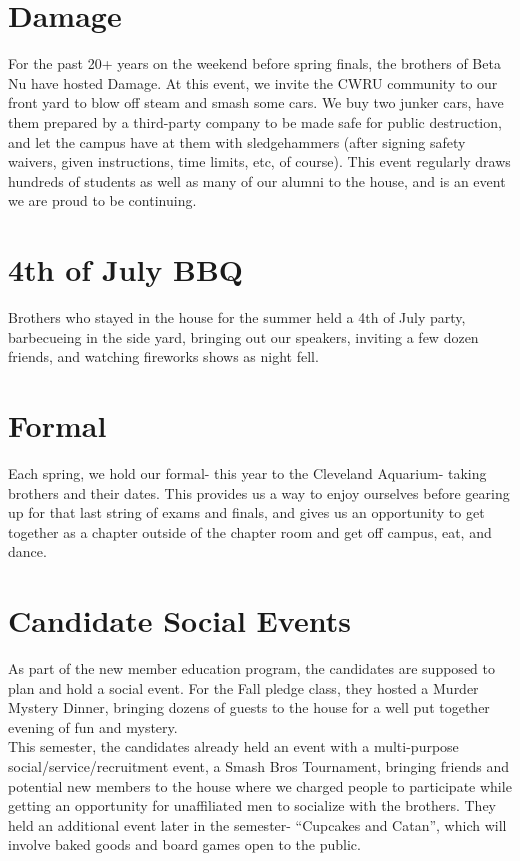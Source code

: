   \section*{Damage}
    For the past 20+ years on the weekend before spring finals, the brothers of Beta Nu have hosted Damage. At this event, we invite the CWRU community to our front yard to blow off steam and smash some cars. We buy two junker cars, have them prepared by a third-party company to be made safe for public destruction, and let the campus have at them with sledgehammers (after signing safety waivers, given instructions, time limits, etc, of course). This event regularly draws hundreds of students as well as many of our alumni to the house, and is an event we are proud to be continuing.
  
  \section*{4th of July BBQ}
    Brothers who stayed in the house for the summer held a 4th of July party, barbecueing in the side yard, bringing out our speakers, inviting a few dozen friends, and watching fireworks shows as night fell.
  
  \section*{Formal}
    Each spring, we hold our formal- this year to the Cleveland Aquarium- taking brothers and their dates. This provides us a way to enjoy ourselves before gearing up for that last string of exams and finals, and gives us an opportunity to get together as a chapter outside of the chapter room and get off campus, eat, and dance.
      
  \section*{Candidate Social Events}
    As part of the new member education program, the candidates are supposed to plan and hold a social event. For the Fall pledge class, they hosted a Murder Mystery Dinner, bringing dozens of guests to the house for a well put together evening of fun and mystery. \\
    
    This semester, the candidates already held an event with a multi-purpose social/service/recruitment event, a Smash Bros Tournament, bringing friends and potential new members to the house where we charged people to participate while getting an opportunity for unaffiliated men to socialize with the brothers. They held an additional event later in the semester- ``Cupcakes and Catan'', which will involve baked goods and board games open to the public.
